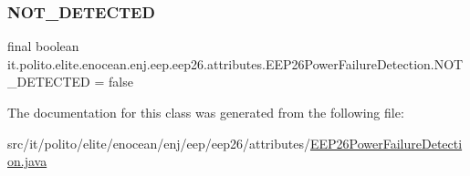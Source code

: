 \subsubsection{\texorpdfstring{N\+O\+T\+\_\+\+D\+E\+T\+E\+C\+T\+ED}{NOT\_DETECTED}}
{\footnotesize\ttfamily final boolean it.\+polito.\+elite.\+enocean.\+enj.\+eep.\+eep26.\+attributes.\+E\+E\+P26\+Power\+Failure\+Detection.\+N\+O\+T\+\_\+\+D\+E\+T\+E\+C\+T\+ED = false\hspace{0.3cm}{\ttfamily [static]}}



The documentation for this class was generated from the following file\+:\begin{DoxyCompactItemize}
\item 
src/it/polito/elite/enocean/enj/eep/eep26/attributes/\hyperlink{_e_e_p26_power_failure_detection_8java}{E\+E\+P26\+Power\+Failure\+Detection.\+java}\end{DoxyCompactItemize}
